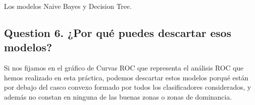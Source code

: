\documentclass[]{article}
\begin{document}
Los modelos Naive Bayes y Decision Tree.

\hypertarget{question-6}{%
	\subsection{Question 6.  ¿Por qué puedes descartar esos modelos?}\label{question-6}}

Si nos fijamos en el gráfico de Curvas ROC que representa el análisis ROC que hemos realizado en esta práctica, podemos descartar estos modelos porqué están por debajo del casco convexo formado por todos los clasificadores considerados, y además no constan en ninguna de las buenas zonas o zonas de dominancia.
\end{document}
